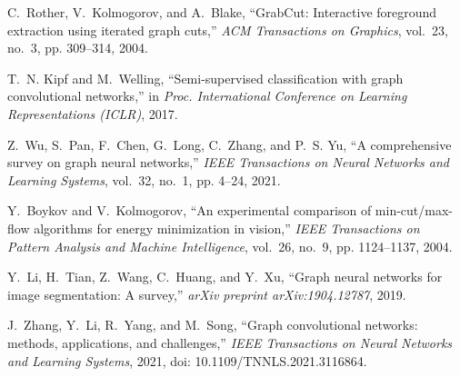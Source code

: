 \documentclass[11pt]{article}
\begin{document}
\begin{thebibliography}{99}

C.~Rother, V.~Kolmogorov, and A.~Blake, ``GrabCut: Interactive foreground extraction using iterated graph cuts,'' \emph{ACM Transactions on Graphics}, vol.~23, no.~3, pp. 309--314, 2004.

T.~N. Kipf and M.~Welling, ``Semi-supervised classification with graph convolutional networks,'' in \emph{Proc. International Conference on Learning Representations (ICLR)}, 2017.

Z.~Wu, S.~Pan, F.~Chen, G.~Long, C.~Zhang, and P.~S. Yu, ``A comprehensive survey on graph neural networks,'' \emph{IEEE Transactions on Neural Networks and Learning Systems}, vol.~32, no.~1, pp. 4--24, 2021.

Y.~Boykov and V.~Kolmogorov, ``An experimental comparison of min-cut/max-flow algorithms for energy minimization in vision,'' \emph{IEEE Transactions on Pattern Analysis and Machine Intelligence}, vol.~26, no.~9, pp. 1124--1137, 2004.

Y.~Li, H.~Tian, Z.~Wang, C.~Huang, and Y.~Xu, ``Graph neural networks for image segmentation: A survey,'' \emph{arXiv preprint arXiv:1904.12787}, 2019.

J.~Zhang, Y.~Li, R.~Yang, and M.~Song, ``Graph convolutional networks: methods, applications, and challenges,'' \emph{IEEE Transactions on Neural Networks and Learning Systems}, 2021, doi: 10.1109/TNNLS.2021.3116864.

\end{thebibliography}


%
%
\end{document}
